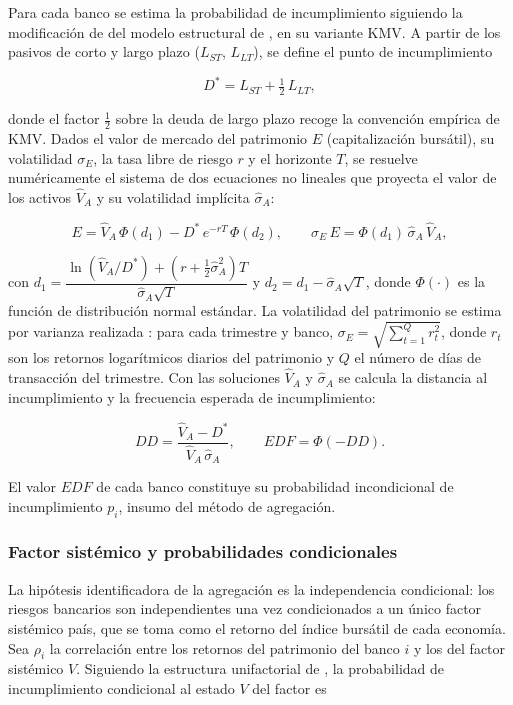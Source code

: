 Para cada banco se estima la probabilidad de incumplimiento siguiendo la modificación de \citet{Kealhofer2000} del modelo estructural de \citet{Merton1974b}, en su variante KMV. A partir de los pasivos de corto y largo plazo ($L_{ST}$, $L_{LT}$), se define el punto de incumplimiento

\[ D^{*} = L_{ST} + \tfrac{1}{2}\,L_{LT}, \]

donde el factor $\tfrac{1}{2}$ sobre la deuda de largo plazo recoge la convención empírica de KMV. Dados el valor de mercado del patrimonio $E$ (capitalización bursátil), su volatilidad $\sigma_E$, la tasa libre de riesgo $r$ y el horizonte $T$, se resuelve numéricamente el sistema de dos ecuaciones no lineales que proyecta el valor de los activos $\hat V_A$ y su volatilidad implícita $\hat\sigma_A$:

\[ E = \hat V_A\,\Phi(d_1) - D^{*}\,e^{-rT}\,\Phi(d_2), \qquad \sigma_E\,E = \Phi(d_1)\,\hat\sigma_A\,\hat V_A, \]

con $d_1 = \dfrac{\ln(\hat V_A/D^{*}) + \left(r + \tfrac{1}{2}\hat\sigma_A^{2}\right)T}{\hat\sigma_A\sqrt{T}}$ y $d_2 = d_1 - \hat\sigma_A\sqrt{T}$, donde $\Phi(\cdot)$ es la función de distribución normal estándar. La volatilidad del patrimonio se estima por varianza realizada \citep{BarndorffNielsenShephard2002}: para cada trimestre y banco, $\sigma_E = \sqrt{\sum_{t=1}^{Q} r_t^{2}}$, donde $r_t$ son los retornos logarítmicos diarios del patrimonio y $Q$ el número de días de transacción del trimestre. Con las soluciones $\hat V_A$ y $\hat\sigma_A$ se calcula la distancia al incumplimiento y la frecuencia esperada de incumplimiento:

\[ DD = \frac{\hat V_A - D^{*}}{\hat V_A\,\hat\sigma_A}, \qquad EDF = \Phi(-DD). \]

El valor $EDF$ de cada banco constituye su probabilidad incondicional de incumplimiento $p_i$, insumo del método de agregación.

\subsubsection{Factor sistémico y probabilidades condicionales}

La hipótesis identificadora de la agregación es la independencia condicional: los riesgos bancarios son independientes una vez condicionados a un único factor sistémico país, que se toma como el retorno del índice bursátil de cada economía. Sea $\rho_i$ la correlación entre los retornos del patrimonio del banco $i$ y los del factor sistémico $V$. Siguiendo la estructura unifactorial de \citet{Vasicek1997}, la probabilidad de incumplimiento condicional al estado $V$ del factor es

